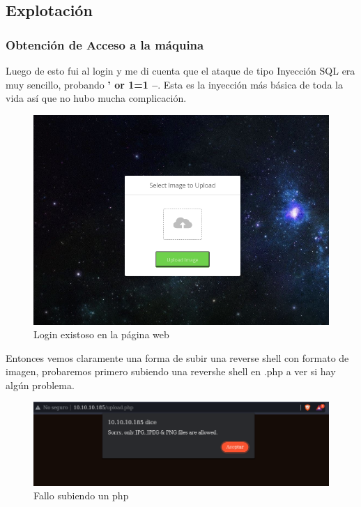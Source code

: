 \documentclass{article}
\begin{document}
\subsection{Explotación}
\subsubsection{Obtención de Acceso a la máquina}
Luego de esto fui al login y me di cuenta que el ataque de tipo Inyección SQL era muy sencillo, probando \textbf{' or 1=1 --}. Esta es la inyección más básica de toda la vida así que no hubo mucha complicación.

\begin{figure}[h!]
	\center 
	\includegraphics[width=\textwidth]{images/magic/login-existoso.png}
	\caption{Login existoso en la página web}
\end{figure}

\clearpage

Entonces vemos claramente una forma de subir una reverse shell con formato de imagen, probaremos primero subiendo una revershe shell en .php a ver si hay algún problema.

\begin{figure}[h!]
	\center 
	\includegraphics[width=\textwidth]{images/magic/fallo-subida-php.png}
	\caption{Fallo subiendo un php}
\end{figure}
\end{document}
